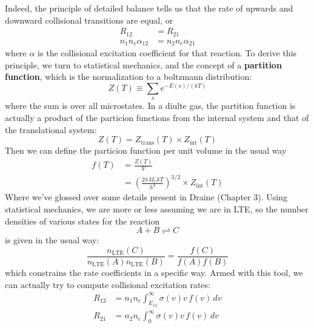 \documentclass[10pt]{article}
\numberwithin{equation}{section}
\newcommand{\n}{\noindent}
\begin{document}
  \n Indeed, the principle of detailed balance tells us that the rate of upwards and downward collisional transitions are equal, or
  \begin{align}
    \label{eq:coll:4}R_{12} &= R_{21}\\
    \label{eq:coll:5}n_1 n_e \alpha_{12} &= n_2 n_e \alpha_{21}
  \end{align}
  where $\alpha$ is the collisional excitation coefficient for that reaction. To derive this principle, we turn to statistical mechanics, and the concept of a \textbf{partition function}, which is the normalization to a boltzmann distribution:
  \begin{equation}
    \label{eq:coll:6} Z(T) \equiv \sum_s e^{-E(s)/(kT)}
  \end{equation}
  where the sum is over all microstates. In a diulte gas, the partition function is actually a product of the particion functions from the internal system and that of the translational system:
  \begin{equation}
    \label{eq:coll:7} Z(T) = Z_{\mathrm{trans}}(T) \times Z_{\mathrm{int}}(T)
  \end{equation}
  Then we can define the particion function per unit volume in the usual way
  \begin{align}
    \label{eq:coll:8} f(T) &= \frac{Z(T)}{V}\\
    \label{eq:coll:9} &= \left(\frac{2\pi M_x kT}{h^3}\right)^{3/2}\times Z_{\mathrm{int}}(T)
  \end{align}
  Where we've glossed over some details present in Draine (Chapter 3). Using statistical mechanics, we are more or less assuming we are in LTE, so the number densities of various states for the reaction
  \begin{equation}
    \label{eq:coll:10} A + B \rightleftharpoons C
  \end{equation}
  is given in the usual way:
  \begin{equation}
    \label{eq:coll:11} \frac{n_{\mathrm{LTE}}(C)}{n_{\mathrm{LTE}}(A)
    n_{\mathrm{LTE}}(B)} = \frac{f(C)}{f(A)f(B)}
  \end{equation}
  which constrains the rate coefficients in a specific way. 
  Armed with this tool, we can actually try to compute collisional excitation rates:
  \begin{align}
    \label{eq:coll:12} R_{12} &= n_1 n_e \int_{E_{\mathrm{12}}}^\infty \sigma(v)v\,f(v)\,dv\\
    \label{eq:coll:13} R_{21} &= n_2 n_e \int_0^\infty \sigma(v)v\,f(v)\,dv
  \end{align}
\end{document}
